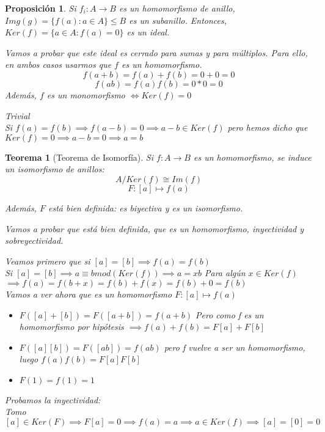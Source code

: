 \documentclass[11pt, a4paper, titlepage]{article}
\makeatletter
\renewenvironment{proof}[1][\proofname] {\vspace{-15pt}\par\pushQED{\qed}\normalfont\topsep6\p@\@plus6\p@\relax\trivlist\item[\hskip\labelsep\it#1\@addpunct{.}]\ignorespaces}{\popQED\endtrivlist\@endpefalse}
\theoremstyle{theorem-style}
\newtheorem*{nth}{Teorema}
\newtheorem*{nprop}{Proposición}
\theoremstyle{definition-style}
\theoremstyle{remark-style}
\theoremstyle{example-style}
\makeatother
\begin{document}
\begin{nprop}
	Si $f_i:A \to B$ es un homomorfismo de anillo, $Img(g) = \{f(a): a \in A\} \leq B$ es un subanillo. Entonces, $Ker(f) = \{a \in A: f(a) = 0\}$ es un ideal.
	\begin{proof}
	Vamos a probar que este ideal es cerrado para sumas y para múltiplos. Para ello, en ambos casos usarmos que $f$ es un homomorfismo.
	\[
	f(a+b) = f(a)+f(b) = 0 + 0 = 0\]\[
	f(ab) = f(a)f(b) = 0*0 = 0
	\]
\end{proof}
Además, $f$ es un monomorfismo $\iff Ker(f) = 0$
\begin{proof}
	\boxed{\Rightarrow} Trivial\\
	\boxed{\Leftarrow} Si $f(a) = f(b) \implies f(a-b) = 0 \implies a-b \in Ker(f)$ pero hemos dicho que $Ker(f) = 0 \implies a-b = 0 \implies a = b$
\end{proof}
\end{nprop}

\begin{nth}[Teorema de Isomorfía]
	Si $f:A \to B$ es un homomorfismo, se induce un isomorfismo de anillos:
	\[
	A/Ker(f) \cong Im(f)
	\]
	\[
	F:[a] \longmapsto f(a)
	\]
	
Además, $F$ está bien definida: es biyectiva y es un isomorfismo.

\begin{proof}
	Vamos a probar que está bien definida, que es un homomorfismo, inyectividad y sobreyectividad.
	
	Veamos primero que si $[a] = [b] \implies f(a) = f(b)$\\
	Si $[a] = [b] \implies a \equiv b mod(Ker(f)) \implies a = xb$ Para algún $x\in Ker(f)$\\
	$\implies f(a) = f(b+x) = f(b) +f(x) = f(b) + 0 = f(b)$\\
	
	Vamos a ver ahora que es un homomorfismo $F:[a] \mapsto f(a)$
	\begin{itemize}
		\item $F([a]+[b]) = F([a+b]) = f(a+b)$ Pero como f es un homomorfismo por hipótesis $\implies f(a)+f(b) = F[a] + F[b]$
		\item $F([a][b]) = F([ab]) = f(ab)$ pero f vuelve a ser un homomorfismo, luego $f(a)f(b) = F[a]F[b]$
		\item $F(1) = f(1) = 1$
\end{itemize}
Probamos la inyectividad:\\
Tomo $[a] \in Ker(F) \implies F[a] = 0 \implies f(a) = a \implies a \in Ker(f) \implies [a] = [0] = 0$
\end{proof}

\end{nth}
\end{document}
